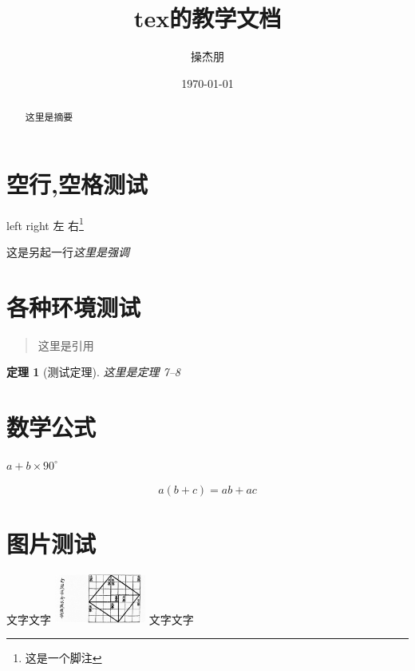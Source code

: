 \documentclass[UTF8]{ctexart}
\title{tex的教学文档}
\author{操杰朋}
\date{\today}
\newtheorem{thm}{定理}
\begin{document}
\maketitle

\tableofcontents

\section{空行,空格测试}

left right 左 右\footnote{这是一个脚注}

这是另起一行\emph{这里是强调}


\section{各种环境测试}

\begin{quote}
   \kaishu 这里是引用
\end{quote}

\begin{abstract}
  这里是摘要
\end{abstract}

\begin{thm}[测试定理]
  这里是定理
    7--8
\end{thm}


\section{数学公式}

$a + b \times 90^\circ$

\begin{equation}
  a(b + c) = ab + ac
\end{equation}


\section{图片测试}

文字文字
\includegraphics[width=3cm]{1.jpg}
文字文字
\end{document}
